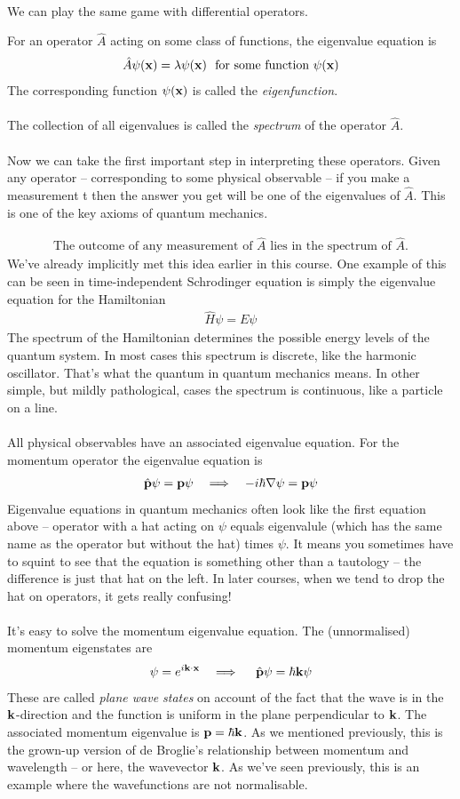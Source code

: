 \documentclass[12pt]{article}
\def\be{\begin{eqnarray}}
\def\ee{\end{eqnarray}}
\newcommand{\nn}{\nonumber}
\newcommand\para{\paragraph{}}
\newcommand{\co}{\color{olive}}
\newcommand{\bk}{{\bf k}}
\newcommand{\bx}{{\bf x}}
\newcommand{\bp}{{\bf p}}
\begin{document}
{\para
We can play the same game with differential operators. {\co For an  operator $\hat{A}$ acting on some class of functions, the eigenvalue equation is
%
\be \hat{A} \psi(\bx) = \lambda \psi(\bx)\ \ \mbox{for some function $\psi(\bx)$}\nn\ee
%
The corresponding function $\psi(\bx)$ is called the {\it eigenfunction}. 

\para
The collection of all eigenvalues is called the {\it spectrum} of the operator $\hat{A}$.}

\para
Now we can take the first important step in interpreting these operators. Given any operator -- corresponding to some physical observable -- if you make a measurement t then the answer  you get will be one of the eigenvalues of $\hat{A}$. This is one of the key axioms of quantum mechanics. 


{\co 
%
\be \boxed{\mbox{
The outcome of any measurement of $\hat{A}$ lies in the spectrum of $\hat{A}$.}}\nn\ee
}
We've already implicitly met this idea earlier in this course. {\co One example of this can be seen in time-independent Schrodinger equation is simply the eigenvalue equation for the Hamiltonian
%
\be \hat{H}\psi = E\psi\nn\ee
%
The spectrum of the Hamiltonian determines the possible energy levels of the quantum system.} In most cases this spectrum is discrete, like the harmonic oscillator. That's what the quantum in quantum mechanics means. In other simple, but mildly pathological, cases the spectrum is continuous, like a particle on a line.

\para
All physical observables have an associated eigenvalue equation. {\co For the momentum operator the eigenvalue equation is
%
\be \hat{\bp} \psi = \bp\psi\ \ \ \Longrightarrow\ \ \ -i\hbar\nabla\psi = \bp \psi\nn\ee
%
}
Eigenvalue equations in quantum mechanics often look like the first equation above -- operator with a hat acting on $\psi$ equals eigenvalule (which has the same name as the operator but without the hat) times $\psi$. It means you sometimes have to squint to see that the equation is something other than a tautology -- the difference is just that hat on the left. In later courses, when we tend to drop the hat on operators, it gets really confusing!




\para
It's easy to solve the momentum eigenvalue equation.  {\co The (unnormalised) momentum eigenstates are
%
\be \psi = e^{i\bk \cdot \bx}\ \ \ \Longrightarrow\ \ \ \ \hat{\bp}\psi = \hbar\bk \psi\nn\ee
%
These are called {\it plane wave states}} on account of the fact that the wave is in the $\bk$-direction and the function is uniform in the plane perpendicular to $\bk$. 
{\co The associated momentum eigenvalue is $\bp = \hbar \bk$.} As we mentioned previously, this is the grown-up version of de Broglie's relationship between momentum and wavelength -- or here, the wavevector ${\bf k}$. As we've seen previously, this is an example where the wavefunctions are not normalisable.



}
\end{document}
